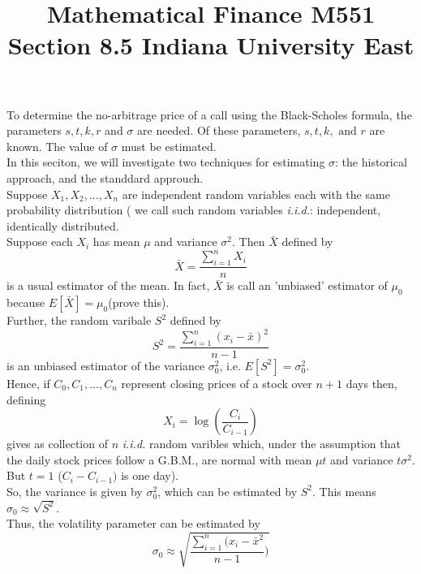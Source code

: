 \documentclass[10 pt, a4paper]{article}
\begin{document}
\title{Mathematical Finance M551 \linebreak Section 8.5  \linebreak Indiana University East}
\author{}
\date{}
\maketitle

To determine the no-arbitrage price of a call using the Black-Scholes formula, the parameters $s,t,k,r$ and $\sigma$ are needed. Of these parameters, $s,t,k, \text{ and } r$ are known. The value of $\sigma$ must be estimated. \\

In this seciton, we will investigate two techniques for estimating $\sigma$: the historical approach, and the standdard approuch. \\

Suppose $X_1,X_2,...,X_n$ are independent random variables each with the same probability distribution ( we call such random variables \textit{i.i.d.}: independent, identically distributed. \\

Suppose each $X_i$ has mean $\mu$ and variance $\sigma^2$. Then $\bar{X}$ defined by
$$\bar{X}=\frac{\sum_{i=1}^n X_i}{n}$$
is a usual estimator of the mean. In fact, $\bar{X}$ is call an 'unbiased' estimator of $\mu_0$ because $E[\bar{X}]=\mu_0$(prove this). \\

Further, the random varibale $S^2$ defined by $$S^2=\frac{\sum_{i=1}^n(x_i-\bar{x})^2}{n-1}$$ is an unbiased estimator of the variance $\sigma^2_0$, i.e. $E[S^2]=\sigma^2_0$. \\

Hence, if $C_0,C_1,...,C_n$ represent closing prices of a stock over $n+1$ days then, defining $$X_i=\log(\frac{C_i}{C_{i-1}})$$ gives as collection of $n$ \textit{i.i.d.} random varibles which, under the assumption that the daily stock prices follow a G.B.M., are normal with mean $\mu t$ and variance $t\sigma^2$. But $t=1$ ($C_i-C_{i-1})$ is one day).\\

So, the variance is given by $\sigma^2_0$, which can be estimated by $S^2$. This means $\sigma_0\approx\sqrt{S^2}$. \\

Thus, the volatility parameter can be estimated by $$\sigma_0\approx\sqrt{\frac{\sum_{i=1}^n(x_i-\bar{x}^2}{n-1})}$$\\
\end{document}

